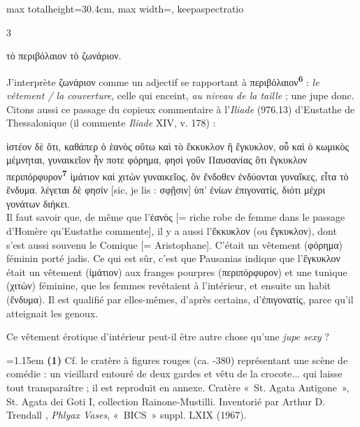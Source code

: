 \documentclass[11pt,twoside]{book}
\newcommand{\italique}[1]{\textit{#1}}
\newcommand{\citComm}[1]{\begin{quoting}[vskip=0.4pt,leftmargin=0.7em,rightmargin=0.2em]#1\end{quoting}}
\newcommand{\marqueur}[1]{\textsuperscript{\color{rubricRed}\textbf{#1}}}
\begin{document}
\begin{adjustbox}{max totalheight=30.4cm, max width=\textwidth, keepaspectratio}
\begin{minipage}{\textwidth}
{\begin{multicols}{3}
\citComm{τὸ περιβόλαιον τὸ ζωνάριον.}
\par\vspace{1.5pt}
\noindent J'interprète ζωνάριον comme un adjectif se rapportant à περιβόλαιον\marqueur{6} : \italique{le vêtement / la couverture}, celle qui enceint, \italique{au niveau de la taille} ; une jupe donc. Citons aussi ce passage du copieux commentaire à l'\italique{Iliade} (976.13) d'Eustathe de Thessalonique (il commente \italique{Iliade} XIV, v. 178) :
\citComm{ἰστέον δὲ ὅτι, καθάπερ ὁ ἑανὸς οὕτω καὶ τὸ ἔκκυκλον ἢ ἔγκυκλον, οὗ καὶ ὁ κωμικὸς μέμνηται, γυναικεῖον ἦν ποτε φόρημα, φησὶ γοῦν Παυσανίας ὅτι ἔγκυκλον περιπόρφυρον\marqueur{7} ἱμάτιον καὶ χιτὼν γυναικεῖος, ὃν ἔνδοθεν ἐνδύονται γυναῖκες, εἶτα τὸ ἔνδυμα. λέγεται δὲ φησίν [sic, je lis : σφῇσιν] ὑπ' ἐνίων ἐπιγονατίς, διότι μέχρι γονάτων διήκει.\\
Il faut savoir que, de même que l'ἑανὸς [= riche robe de femme dans le passage d'Homère qu'Eustathe commente], il y a aussi l'ἔκκυκλον (ou ἔγκυκλον), dont s'est aussi souvenu le Comique [= Aristophane]. C'était un vêtement (φόρημα) féminin porté jadis. Ce qui est sûr, c'est que Pausanias indique que l'ἔγκυκλον était un vêtement (ἱμάτιον) aux franges pourpres (περιπόρφυρον) et une tunique (χιτὼν) féminine, que les femmes revêtaient à l'intérieur, et ensuite un habit (ἔνδυμα). Il est qualifié par elles-mêmes, d'après certains, d'ἐπιγονατίς, parce qu'il atteignait les genoux.}
\par\vspace{1.5pt}
\noindent Ce vêtement érotique d'intérieur peut-il être autre chose qu'une \italique{jupe sexy} ?
\par\vspace{1.5pt}
\par\vspace{1.2pt}\par\nopagebreak\vspace{1pt}\noindent\hangindent=1.15em {\color{sepiaNote}\textbf{(1)}} Cf. le cratère à figures rouges (ca. -380) représentant une scène de comédie : un vieillard entouré de deux gardes et vêtu de la crocote... qui laisse tout transparaître ; il est reproduit en annexe. Cratère «~St. Agata Antigone~», St. Agata dei Goti I, collection Rainone-Mustilli. Inventorié par Arthur D. Trendall , \italique{Phlyax Vases}, «~BICS~» suppl. LXIX (1967).
\par\vspace{1.5pt}

\end{multicols}}
\end{minipage}
\end{adjustbox}
\end{document}

